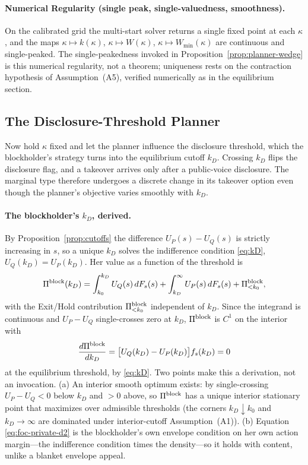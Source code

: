 \paragraph{Numerical Regularity (single peak, single-valuedness, smoothness).}
On the calibrated grid the multi-start solver returns a single fixed point at each
$\kappa$, and the maps $\kappa\mapsto k(\kappa)$, $\kappa\mapsto W(\kappa)$,
$\kappa\mapsto W_{\min}(\kappa)$ are continuous and single-peaked. The
single-peakedness invoked in Proposition~\ref{prop:planner-wedge} is this
numerical regularity, not a theorem; uniqueness rests on the contraction
hypothesis of Assumption~\textup{(A5)}, verified numerically as in the
equilibrium section.

%
\subsection{The Disclosure-Threshold Planner}
\label{sec:welf-kD}
%

Now hold $\kappa$ fixed and let the planner influence the disclosure threshold,
which the blockholder's strategy turns into the equilibrium cutoff $k_D$. Crossing
$k_D$ flips the disclosure flag, and a takeover arrives only after a public-voice
disclosure. The marginal type therefore undergoes a discrete change in its
takeover option even though the planner's objective varies smoothly with $k_D$.

\paragraph{The blockholder's $k_D$, derived.}
By Proposition~\ref{prop:cutoffs} the difference $U_P(s)-U_Q(s)$ is strictly
increasing in $s$, so a unique $k_D$ solves the indifference condition
\eqref{eq:kD}, $U_Q(k_D)=U_P(k_D)$. Her value as a function of the threshold is
\begin{equation}
\Pi^{\textup{block}}(k_D)=\int_{k_0}^{k_D}U_Q(s)\,dF_s(s)
   +\int_{k_D}^{\infty}U_P(s)\,dF_s(s)+\Pi^{\textup{block}}_{<k_0},
\label{eq:Piblock-kD}
\end{equation}
with the Exit/Hold contribution $\Pi^{\textup{block}}_{<k_0}$ independent of
$k_D$. Since the integrand is continuous and $U_P-U_Q$ single-crosses zero at
$k_D$, $\Pi^{\textup{block}}$ is $C^1$ on the interior with
\begin{equation}
\frac{d\Pi^{\textup{block}}}{dk_D}
 =\big[U_Q(k_D)-U_P(k_D)\big]f_s(k_D)=0
\label{eq:foc-private-d2}
\end{equation}
at the equilibrium threshold, by \eqref{eq:kD}. Two points make this a
derivation, not an invocation. (a) An interior smooth optimum exists: by
single-crossing $U_P-U_Q<0$ below $k_D$ and $>0$ above, so
$\Pi^{\textup{block}}$ has a unique interior stationary point that maximizes over
admissible thresholds (the corners $k_D\!\downarrow\!k_0$ and $k_D\!\to\!\infty$
are dominated under interior-cutoff Assumption~\textup{(A1)}). (b) Equation
\eqref{eq:foc-private-d2} is the blockholder's own envelope condition on her own
action margin---the indifference condition times the density---so it holds with
content, unlike a blanket envelope appeal.

